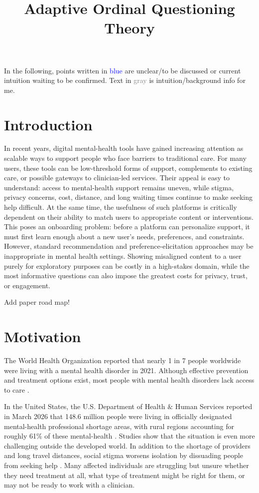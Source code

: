 \documentclass{article}
\title{Adaptive Ordinal Questioning Theory}
\author{}
\date{}
\begin{document}
\maketitle
{}
\tableofcontents

\newpage

In the following, points written in \textcolor{blue}{blue} are unclear/to be discussed or current intuition waiting to be confirmed. Text in \textcolor{gray}{gray} is intuition/background info for me.\\


\chapter{Introduction}
In recent years, digital mental-health tools have gained increasing attention as scalable ways to support people who face barriers to traditional care. For many users, these tools can be low-threshold forms of support, complements to existing care, or possible gateways to clinician-led services. Their appeal is easy to understand: access to mental-health support remains uneven, while stigma, privacy concerns, cost, distance, and long waiting times continue to make seeking help difficult. At the same time, the usefulness of such platforms is critically dependent on their ability to match users to appropriate content or interventions. This poses an onboarding problem: before a platform can personalize support, it must first learn enough about a new user's needs, preferences, and constraints. However, standard recommendation and preference-elicitation approaches may be inappropriate in mental health settings. Showing misaligned content to a user purely for exploratory purposes can be costly in a high-stakes domain, while the most informative questions can also impose the greatest costs for privacy, trust, or engagement.

Add paper road map!

\newpage
\chapter{Motivation}\label{chapter:moti}
The World Health Organization reported that nearly 1 in 7 people worldwide were living with a mental health disorder in 2021. Although effective prevention and treatment options exist, most people with mental health disorders lack access to care \cite{WHO2025MentalDisorders}. 

In the United States, the U.S. Department of Health $\&$ Human Services reported in March 2026 that 148.6 million people were living in officially designated mental-health professional shortage areas, with rural regions accounting for roughly 61$\%$ of these mental-health  \cite{hrsa2025hpsa_q2}. Studies show that the situation is even more challenging outside the developed world. In addition to the shortage of providers and long travel distances, social stigma worsens isolation by dissuading people from seeking help \cite{clement2015stigma_helpseeking}. Many affected individuals are struggling but unsure whether they need treatment at all, what type of treatment might be right for them, or may not be ready to work with a clinician.
\end{document}
